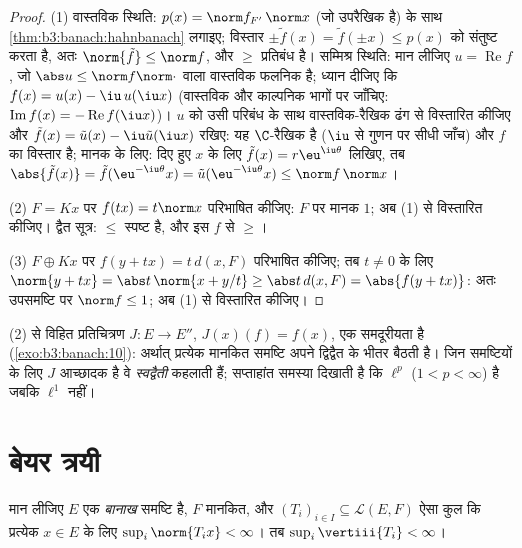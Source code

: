 \begin{proof}
(1) वास्तविक स्थिति: $p(x)
= \norm f_{F'}\,\norm x$ (जो उपरैखिक है) के साथ \cref{thm:b3:banach:hahnbanach} लगाइए;
विस्तार $\pm\tilde f(x) = \tilde f(\pm x) \leq p(x)$ को संतुष्ट करता है, अतः $\norm{\tilde f} \leq \norm f$, और $\geq$ प्रतिबंध
है। सम्मिश्र स्थिति: मान लीजिए $u = \operatorname{Re}f$, जो $\abs u \leq \norm f\norm\cdot$ वाला वास्तविक
फलनिक है; ध्यान दीजिए कि $f(x) = u(x) -
\iu\,u(\iu x)$ (वास्तविक और काल्पनिक भागों पर
जाँचिए: $\operatorname{Im}f(x) = -\operatorname{Re}f(\iu x)$)। $u$ को उसी परिबंध के साथ वास्तविक-रैखिक ढंग से
विस्तारित कीजिए और $\tilde f(x) =
\tilde u(x) - \iu\tilde u(\iu x)$ रखिए: यह $\C$-रैखिक है ($\iu$ से गुणन
पर सीधी जाँच) और $f$ का विस्तार है; मानक के लिए: दिए हुए $x$
के लिए $\tilde f(x) = r\eu^{\iu\theta}$ लिखिए, तब $\abs{\tilde f(x)}
= \tilde f(\eu^{-\iu\theta}x) = \tilde u(\eu^{-\iu\theta}x)
\leq \norm f\,\norm x$।

(2) $F = Kx$ पर $f(tx) = t\norm x$ परिभाषित कीजिए: $F$ पर मानक $1$; अब (1)
से विस्तारित कीजिए। द्वैत सूत्र: $\leq$ स्पष्ट है, और इस $f$ से
$\geq$।

(3) $F \oplus Kx$ पर $f(y + tx) = t\,d(x, F)$ परिभाषित कीजिए; तब $t \neq 0$ के लिए $\norm{y + tx} = \abs t\,\norm{x + y/t} \geq \abs
t\,d(x, F) = \abs{f(y + tx)}$: अतः
उपसमष्टि पर $\norm f \leq 1$; अब (1) से विस्तारित कीजिए।
\end{proof}

\begin{remark}\label{rem:b3:banach:bidual}
(2) से विहित प्रतिचित्रण $J \colon E \to E''$, $J(x)(f) =
f(x)$, एक समदूरीयता है (\cref{exo:b3:banach:10}):
अर्थात् प्रत्येक मानकित समष्टि अपने द्विद्वैत के भीतर बैठती है।
जिन समष्टियों के लिए $J$ आच्छादक है वे \emph{स्वद्वैती} कहलाती हैं; सप्ताहांत समस्या दिखाती है कि $\ell^p$ ($1 < p < \infty$)
 है जबकि $\ell^1$ नहीं।
\end{remark}

\section{बेयर त्रयी}

\begin{theorem}
\label{thm:b3:banach:banachsteinhaus}
मान लीजिए $E$ एक \emph{बानाख} समष्टि है, $F$ मानकित, और
$(T_i)_{i\in
I} \subseteq \mathcal L(E, F)$ ऐसा कुल कि प्रत्येक $x \in E$ के लिए $\sup_i
\norm{T_ix} < \infty$। तब
$\sup_i
\vertiii{T_i} < \infty$।
\end{theorem}

